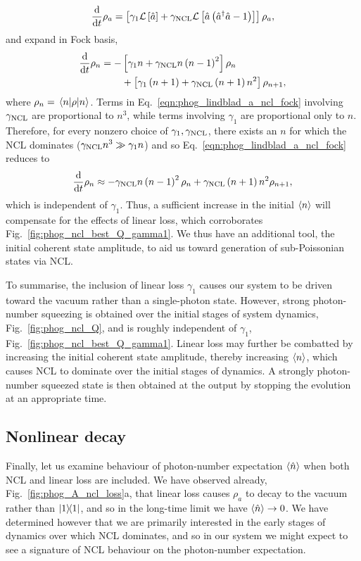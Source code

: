 \begin{equation}\label{eqn:phog_lindblad_a_ncl_2}
\frac{\mathrm{d}}{\mathrm{d}t} \rho_a = \left[ \gamma_1 \mathcal{L}\left[\hat{a}\right] + \gamma_{\text{NCL}} \mathcal{L}\left[\hat{a}\left(\hat{a}^\dagger \hat{a} - 1\right)\right]\right] \rho_a,
\end{equation}
and expand in Fock basis,
\begin{align}\label{eqn:phog_lindblad_a_ncl_fock}
\ddt \rho_{n} = - &\left[ \gamma_1 n + \gncl n \left(n - 1\right)^2 \right] \rho_n \notag \\
%
&+\left[ \gamma_1 \left(n+1\right) + \gncl \left(n+1\right) n^2 \right] \rho_{n+1},
\end{align}
where $\rho_n = \ev{\rho}{n}$. Terms in Eq.~\ref{eqn:phog_lindblad_a_ncl_fock} involving $\gamma_{\text{NCL}}$ are proportional to $n^3$, while terms involving $\gamma_1$ are proportional only to $n$. Therefore, for every nonzero choice of $\gamma_1, \gamma_{\text{NCL}}$, there exists an $n$ for which the NCL dominates ($\gamma_{\text{NCL}} n^3 \gg \gamma_1 n$) and so Eq.~\ref{eqn:phog_lindblad_a_ncl_fock} reduces to
\begin{equation}
\frac{\mathrm{d}}{\mathrm{d}t} \rho_n \approx - \gamma_{\text{NCL}} n \left(n-1\right)^2 \rho_n + \gamma_{\text{NCL}} \left(n+1\right)n^2 \rho_{n+1},
\end{equation}
which is independent of $\gamma_1$. Thus, a sufficient increase in the initial $\ev{n}$ will compensate for the effects of linear loss, which corroborates Fig.~\ref{fig:phog_ncl_best_Q_gamma1}. We thus have an additional tool, the initial coherent state amplitude, to aid us toward generation of sub-Poissonian states via NCL.

To summarise, the inclusion of linear loss $\gamma_1$ causes our system to be driven toward the vacuum rather than a single-photon state. However, strong photon-number squeezing is obtained over the initial stages of system dynamics, Fig.~\ref{fig:phog_ncl_Q}, and is roughly independent of $\gamma_1$, Fig.~\ref{fig:phog_ncl_best_Q_gamma1}. Linear loss may further be combatted \cite{Mikhalychev2011, Mogilevtsev2013} by increasing the initial coherent state amplitude, thereby increasing $\ev{n}$, which causes NCL to dominate over the initial stages of dynamics. A strongly photon-number squeezed state is then obtained at the output by stopping the evolution at an appropriate time.


\subsection{Nonlinear decay}

Finally, let us examine behaviour of photon-number expectation $\ev{\hat{n}}$ when both NCL and linear loss are included. We have observed already, Fig.~\ref{fig:phog_A_ncl_loss}a, that linear loss causes $\rho_a$ to decay to the vacuum rather than $\dyad{1}$, and so in the long-time limit we have $\ev{\hat{n}} \rightarrow 0$. We have determined however that we are primarily interested in the early stages of dynamics over which NCL dominates, and so in our system we might expect to see a signature of NCL behaviour on the photon-number expectation.

